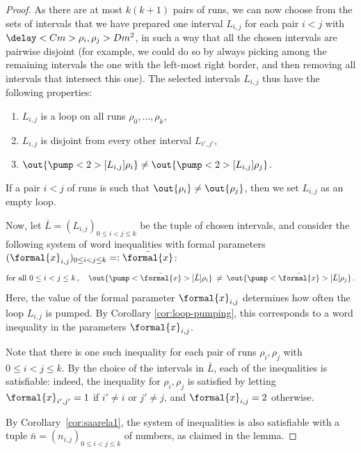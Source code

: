 \documentclass{article}
\begin{document}
\begin{proof}
As there are at most $k (k+1)$ pairs of runs, 
we can now choose from the sets of intervals that we have prepared 
one interval $L_{i,j}$ for each pair $i<j$ with $\delay<C m>{\rho_i,\rho_j} > D m^2$,
in such a way that all the chosen intervals are pairwise disjoint 
(for example, we could do so by always picking among the remaining intervals 
the one with the left-most right border, and then removing all intervals 
that intersect this one).
The selected intervals $L_{i,j}$ thus have the following properties:
\begin{enumerate}
\item $L_{i,j}$ is a loop on all runs $\rho_0,\dots,\rho_k$,
\item $L_{i,j}$ is disjoint from every other interval $L_{i',j'}$,
\item $\out{\pump<2>[L_{i,j}]{\rho_i}} \neq \out{\pump<2>[L_{i,j}]{\rho_j}}$.
\end{enumerate}
%
If a pair $i<j$ of runs is such that 
$\out{\rho_i} \neq \out{\rho_j}$, 
then we set $L_{i,j}$ as an empty loop. 

Now, let $\bar{L} = (L_{i,j})_{0 \le i < j \le k}$ be the tuple of chosen intervals, and consider the following system of word inequalities with formal parameters $(\formal{x}_{i,j})_{0\le i < j \le k} =: \bar{\formal{x}}$:
\[
  \text{for all } 0\le i<j\le k\,, \quad 
  \out{\pump<\bar{\formal{x}}>[\bar L]{\rho_i}} 
  \:\neq\:
  \out{\pump<\bar{\formal{x}}>[\bar L]{\rho_j}} \, .
\]
Here, the value of the formal parameter $\formal{x}_{i,j}$ determines how often the loop $L_{i,j}$ is pumped. By Corollary \ref{cor:loop-pumping}, this corresponds to a word inequality in the parameters $\formal{x}_{i,j}$.

Note that there is one such inequality for each pair of runs $\rho_i,\rho_j$ with $0 \le i < j \le k$. 
By the choice of the intervals in $\bar{L}$, each of the inequalities is satisfiable: 
indeed, the inequality for $\rho_i,\rho_j$ is satisfied by letting 
$\formal{x}_{i',j'} = 1$ if $i' \not = i$ or $j' \not = j$, and
$\formal{x}_{i,j} = 2$ otherwise. 

By Corollary~\ref{cor:saarela1}, the system of inequalities is also satisfiable with a tuple $\bar n = (n_{i,j})_{0 \le i < j \le k}$ of numbers, as claimed in the lemma.
\end{proof}
\end{document}
